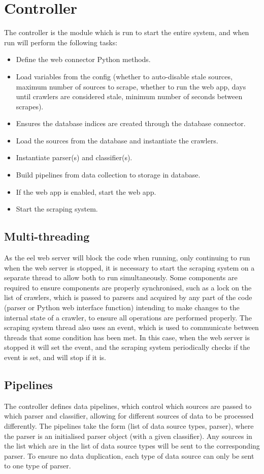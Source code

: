 \documentclass{l4proj}
\begin{document}
\section{Controller}
The controller is the module which is run to start the entire system, and when run will perform the following tasks:
\begin{itemize}
    \item Define the web connector Python methods.
    \item Load variables from the config (whether to auto-disable stale sources, maximum number of sources to scrape, whether to run the web app, days until crawlers are considered stale, minimum number of seconds between scrapes).
    \item Ensures the database indices are created through the database connector.
    \item Load the sources from the database and instantiate the crawlers.
    \item Instantiate parser(s) and classifier(s).
    \item Build pipelines from data collection to storage in database.
    \item If the web app is enabled, start the web app.
    \item Start the scraping system.
\end{itemize}

\subsection{Multi-threading}
As the eel web server will block the code when running, only continuing to run when the web server is stopped, it is necessary to start the scraping system on a separate thread to allow both to run simultaneously. Some components are required to ensure components are properly synchronised, such as a lock on the list of crawlers, which is passed to parsers and acquired by any part of the code (parser or Python web interface function) intending to make changes to the internal state of a crawler, to ensure all operations are performed properly. The scraping system thread also uses an event, which is used to communicate between threads that some condition has been met. In this case, when the web server is stopped it will set the event, and the scraping system periodically checks if the event is set, and will stop if it is. 

\subsection{Pipelines}
The controller defines data pipelines, which control which sources are passed to which parser and classifier, allowing for different sources of data to be processed differently. The pipelines take the form (list of data source types, parser), where the parser is an initialised parser object (with a given classifier). Any sources in the list which are in the list of data source types will be sent to the corresponding parser. To ensure no data duplication, each type of data source can only be sent to one type of parser.
\end{document}
